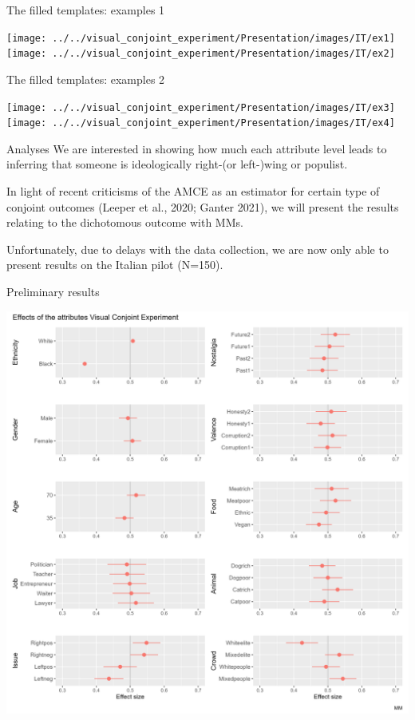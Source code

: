 \documentclass[
  ignorenonframetext,
]{beamer}
\begin{document}
\begin{frame}{The filled templates: examples 1}
\label{the-filled-templates-examples-1}
\begin{center}\texttt{[image: ../../visual\_conjoint\_experiment/Presentation/images/IT/ex1]} \texttt{[image: ../../visual\_conjoint\_experiment/Presentation/images/IT/ex2]} \end{center}
\end{frame}

\begin{frame}{The filled templates: examples 2}
\label{the-filled-templates-examples-2}
\begin{center}\texttt{[image: ../../visual\_conjoint\_experiment/Presentation/images/IT/ex3]} \texttt{[image: ../../visual\_conjoint\_experiment/Presentation/images/IT/ex4]} \end{center}
\end{frame}

\begin{frame}{Analyses}
\label{analyses}
We are interested in showing how much each attribute level leads to
inferring that someone is ideologically right-(or left-)wing or
populist.

In light of recent criticisms of the AMCE as an estimator for certain
type of conjoint outcomes (Leeper et al., 2020; Ganter 2021), we will
present the results relating to the dichotomous outcome with MMs.

Unfortunately, due to delays with the data collection, we are now only
able to present results on the Italian pilot (N=150).
\end{frame}

\begin{frame}{Preliminary results}
\label{preliminary-results}
\begin{center}\includegraphics[width=0.7\linewidth]{Presentation/images/singlecountry} \end{center}
\end{frame}
\end{document}
